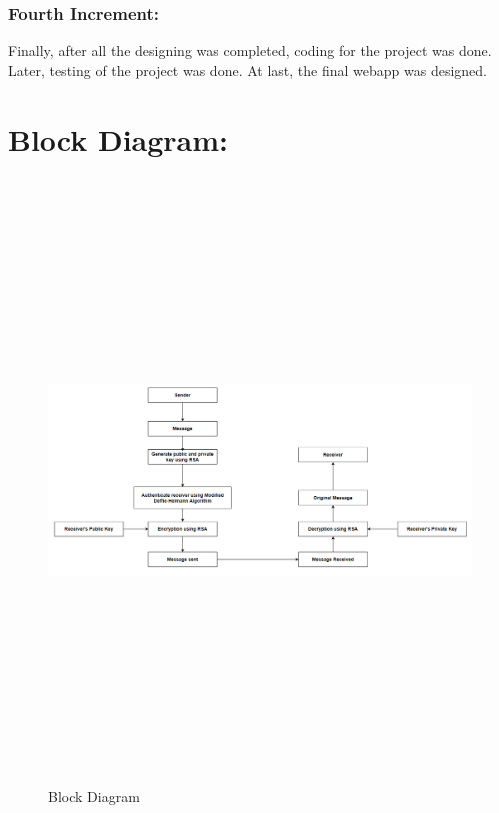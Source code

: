 \subsubsection{Fourth Increment:}
Finally, after all the designing was completed, coding for the project was done. Later,
testing of the project was done.
At last, the final webapp was designed.
\pagebreak

\section{Block Diagram:}
\begin{figure}[H]
	\centering
	\includegraphics[width=170mm, height=160mm]{images/block diag.png}
	\caption{Block Diagram} %
	\label{figblockdiagram} %
\end{figure}


